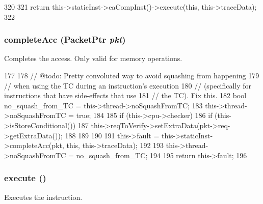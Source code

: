 \begin{DoxyCode}
320     {
321         return this->staticInst->eaCompInst()->execute(this, this->traceData);
322     }
\end{DoxyCode}
\hypertarget{classBaseO3DynInst_ae3a7c08c75c0a49df5adfb7d43996e12}{
\subsubsection[{completeAcc}]{ completeAcc ({\bf PacketPtr} {\em pkt})}}
\label{classBaseO3DynInst_ae3a7c08c75c0a49df5adfb7d43996e12}
Completes the access. Only valid for memory operations. 


\begin{DoxyCode}
177 {
178     // @todo: Pretty convoluted way to avoid squashing from happening
179     // when using the TC during an instruction's execution
180     // (specifically for instructions that have side-effects that use
181     // the TC).  Fix this.
182     bool no_squash_from_TC = this->thread->noSquashFromTC;
183     this->thread->noSquashFromTC = true;
184 
185     if (this->cpu->checker) {
186         if (this->isStoreConditional()) {
187             this->reqToVerify->setExtraData(pkt->req->getExtraData());
188         }
189     }
190 
191     this->fault = this->staticInst->completeAcc(pkt, this, this->traceData);
192 
193     this->thread->noSquashFromTC = no_squash_from_TC;
194 
195     return this->fault;
196 }
\end{DoxyCode}
\hypertarget{classBaseO3DynInst_a1a8de76be7ad0985553c5bae9f26a55b}{
\subsubsection[{execute}]{ execute ()}}
\label{classBaseO3DynInst_a1a8de76be7ad0985553c5bae9f26a55b}
Executes the instruction. 


